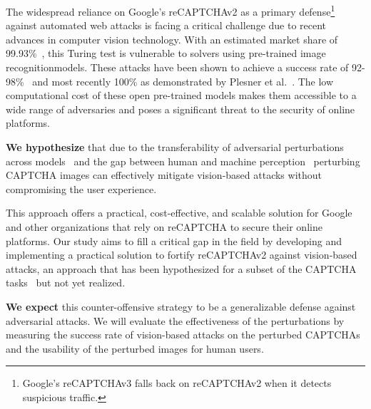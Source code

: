 \documentclass[a4paper,11pt]{article}
\newcounter{num}
\begin{document}


The widespread reliance on Google's reCAPTCHAv2 as a primary defense\footnote{Google's reCAPTCHAv3 falls back on reCAPTCHAv2 when it detects suspicious traffic.} against automated web attacks is facing a critical challenge due to recent advances in computer vision technology. With an estimated market share of 99.93\%~\cite{captchashare}, this Turing test is vulnerable to solvers using pre-trained image recognitionmodels. These attacks have been shown to achieve a success rate of 92-98\%~\cite{9121132,hossen2019bots,sukhani2021automating,hossen2020object} and most recently 100\% as demonstrated by Plesner et al.~\cite{plesner2024breaking}. The low computational cost of these open pre-trained models makes them accessible to a wide range of adversaries and poses a significant threat to the security of online platforms.

\bigskip

\textbf{We hypothesize} that due to the transferability of adversarial perturbations across models~\cite{goodfellow2014explaining, demontis2019adversarial} and the gap between human and machine perception~\cite{elsayed2018adversarial} perturbing CAPTCHA images can effectively mitigate vision-based attacks without compromising the user experience.

This approach offers a practical, cost-effective, and scalable solution for Google and other organizations that rely on reCAPTCHA to secure their online platforms.  Our study aims to fill a critical gap in the field by developing and implementing a practical solution to fortify reCAPTCHAv2 against vision-based attacks, an approach that has been hypothesized for a subset of the CAPTCHA tasks~\cite{hitaj2020capture} but not yet realized.

\bigskip

\textbf{We expect} this counter-offensive strategy to be a generalizable defense against adversarial attacks. We will evaluate the effectiveness of the perturbations by measuring the success rate of vision-based attacks on the perturbed CAPTCHAs and the usability of the perturbed images for human users.
\end{document}
